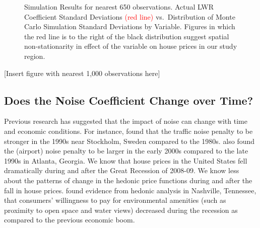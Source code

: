 \documentclass{article}\usepackage{graphicx, color}
\begin{document}
\begin{figure}
 \caption{Simulation Results for nearest 650 observations. Actual LWR Coefficient Standard Deviations \textcolor{red}{(red line)} vs.\ Distribution of Monte Carlo Simulation Standard Deviations by Variable. Figures in which the red line is to the right of the black distribution suggest spatial non-stationarity in effect of the variable on house prices in our study region.}\label{fig:MCsds650}
\end{figure}

[Insert figure with nearest 1,000 observations here]

\subsection{Does the Noise Coefficient Change over Time?}

Previous research has suggested that the impact of noise can change with time and economic conditions. For instance, \citet{Wilhelmsson2000} found that the traffic noise penalty to be stronger in the 1990s near Stockholm, Sweden compared to the 1980s. \citet{Cohen2009} also found the (airport) noise penalty to be larger in the early 2000s compared to the late 1990s in Atlanta, Georgia. We know that house prices in the United States fell dramatically during and after the Great Recession of 2008-09. We know less about the patterns of change in the hedonic price functions during and after the fall in house prices. \citet{Cho2011b} found evidence from hedonic analysis in Nashville, Tennessee, that consumers' willingness to pay for environmental amenities (such as proximity to open space and water views) decreased during the recession as compared to the previous economic boom. 
\end{document}
